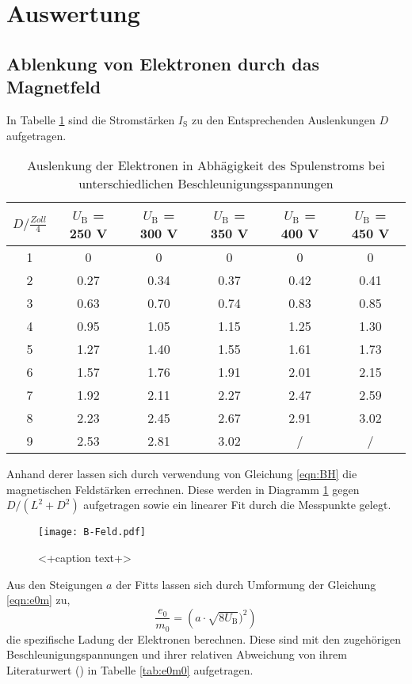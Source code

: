 \section{Auswertung}
\label{sec:Auswertung}
\subsection{Ablenkung von Elektronen durch das Magnetfeld}
In Tabelle \ref{tab:DIS} sind die Stromstärken $I_\text{S}$ zu den Entsprechenden Auslenkungen $D$ aufgetragen.
\begin{table}
  \centering
  \begin{tabular}{c| c c c c c }
    \toprule
    $D / \frac{Zoll}{4}$ & $U_\text{B}$ = 250 V & $U_\text{B}$ = 300 V & $U_\text{B}$ = 350 V & $U_\text{B}$ = 400 V & $U_\text{B}$ = 450 V \\
    \midrule
    1 &	0	&0	&0	&0	&0	\\
    2 &	0.27	&0.34	&0.37	&0.42	&0.41	\\
    3 &	0.63	&0.70	&0.74	&0.83	&0.85	\\
    4 &	0.95	&1.05	&1.15	&1.25	&1.30	\\
    5 &	1.27	&1.40	&1.55	&1.61	&1.73	\\
    6 &	1.57	&1.76	&1.91	&2.01	&2.15	\\
    7 &	1.92	&2.11 	&2.27	&2.47	&2.59	\\
    8 &	2.23	&2.45	&2.67	&2.91	&3.02	\\
    9 &	2.53	&2.81	&3.02	&/	&/	\\
    \bottomrule
  \end{tabular}
  \caption{Auslenkung der Elektronen in Abhägigkeit des Spulenstroms bei unterschiedlichen Beschleunigungsspannungen}
  \label{tab:DIS}
\end{table}
Anhand derer lassen sich durch verwendung von Gleichung \eqref{eqn:BH} die magnetischen Feldstärken errechnen. Diese werden in Diagramm \ref{fig:bfeld} gegen $D/(L^2+D^2)$ aufgetragen sowie ein linearer Fit durch die Messpunkte gelegt.
\begin{figure}
  \centering
  \texttt{[image: B-Feld.pdf]}
  \caption{<+caption text+>}
  \label{fig:bfeld}
\end{figure}
Aus den Steigungen $a$ der Fitts lassen sich durch Umformung der Gleichung \eqref{eqn:e0m} zu,
\begin{equation}
  \frac{e_0}{m_0} = \left( a \cdot \sqrt{8 U_\text{B}} )^2 \right)
  \label{eqn:e0m0}
\end{equation}
die spezifische Ladung der Elektronen berechnen. Diese sind mit den zugehörigen Beschleunigungspannungen und ihrer relativen Abweichung von ihrem Literaturwert (\cite{spez}) in Tabelle \ref{tab:e0m0} aufgetragen.
